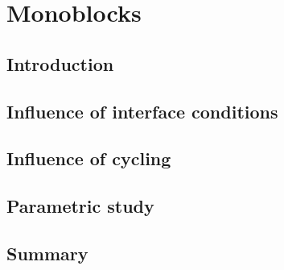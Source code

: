 \chapter{Monoblocks}
\section{Introduction}
\section{Influence of interface conditions}

\section{Influence of cycling}
\section{Parametric study}

\section{Summary}